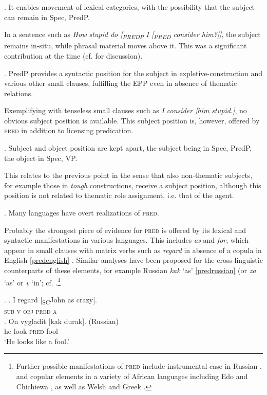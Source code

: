 \documentclass [output=book,colorlinks,citecolor=brown]{langscibook}
\begin{document}
\ex. It enables movement of lexical categories, with the possibility that the subject can remain in Spec, PredP.

In a sentence such as \textit{How stupid do [\textsubscript{PREDP} I [\textsubscript{PRED} consider him?]]}, the subject remains in-situ, while phrasal material moves above it. This was a significant contribution at the time (cf. \citealt[68–69]{matushansky:2019:against} for discussion).

\ex. PredP provides a syntactic position for the subject in expletive-construction and various other small clauses, fulfilling the EPP even in absence of thematic relations.

Exemplifying with tenseless small clauses such as \textit{I consider [him stupid.]}, no obvious subject position is available. This subject position is, however, offered by \textsc{pred} in addition to licensing predication.

\ex. Subject and object position are kept apart, the subject being in Spec, PredP, the object in Spec, VP.

This relates to the previous point in the sense that also non-thematic subjects, for example those in \textit{tough} constructions, receive a subject position, although this position is not related to thematic role assignment, i.e. that of the agent.

\ex. Many languages have overt realizations of \textsc{pred}.

Probably the strongest piece of evidence for \textsc{pred} is offered by its lexical and syntactic manifestations in various languages. This includes \textit{as} and \textit{for}, which appear in small clauses with matrix verbs such as \textit{regard} in absence of a copula in English \ref{predenglish} \citep[596]{bowers:1993:predication}. Similar analyses have been proposed for the cross-linguistic counterparts of these elements, for example Russian \textit{kak} `as' \ref{predrussian} (or \textit{za} `as' or \textit{v} `in’; cf. \citet{bailyn:2002:overt}.\footnote{Further possible manifestations of \textsc{pred} include instrumental case in Russian \citep{bailyn:2001:syntax}, and copular elements in a variety of African languages including Edo and Chichiewa \citep{baker:2003:cat}, as well as Welsh \citep{bowers:2002:pred} and Greek \citep{campos:2004:ds}.}

\ex. \ag. I regard [\textsubscript{SC}John as crazy].\\
\textsc{sub} \textsc{v} \textsc{obj} \textsc{pred} \textsc{a} \null\hfill \citep[596]{bowers:1993:predication} \label{predenglish}\\
\bg. On vygladit [kak durak]. (Russian)\\
he look \textsc{pred} fool\\
`He looks like a fool.’ \null\hfill \citep[39]{bailyn:2002:overt} \label{predrussian}
\end{document}
